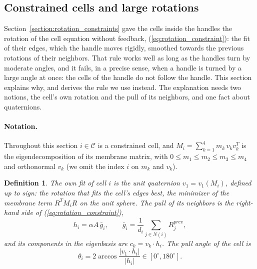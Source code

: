 \documentclass{birkjour}
\newtheorem{defn}[thm]{Definition}
\theoremstyle{remark}
\numberwithin{equation}{section}
\begin{document}
\subsection{Constrained cells and large rotations}
\label{section:hard_case}

Section~\ref{section:rotation_constraints} gave the cells inside the handles the rotation of the cell equation without feedback, (\ref{eq:rotation_constraint}): the fit of their edges, which the handle moves rigidly, smoothed towards the previous rotations of their neighbors. That rule works well as long as the handles turn by moderate angles, and it fails, in a precise sense, when a handle is turned by a large angle at once: the cells of the handle do not follow the handle. This section explains why, and derives the rule we use instead. The explanation needs two notions, the cell's own rotation and the pull of its neighbors, and one fact about quaternions.

\paragraph{Notation.} Throughout this section $i \in \mathcal C$ is a constrained cell, and $M_i = \sum_{k=1}^4 m_k \, v_k v_k^T$ is the eigendecomposition of its membrane matrix, with $0 \leq m_1 \leq m_2 \leq m_3 \leq m_4$ and orthonormal $v_k$ (we omit the index $i$ on $m_k$ and $v_k$).
\begin{defn}
\label{defn:pull}
The \emph{own fit} of cell $i$ is the unit quaternion $v_1 = v_1(M_i)$, defined up to sign: the rotation that fits the cell's edges best, the minimizer of the membrane term $R^T M_i R$ on the unit sphere. The \emph{pull} of its neighbors is the right-hand side of (\ref{eq:rotation_constraint}),
\begin{equation*}
h_i = \alpha A \, \bar g_i, \qquad \bar g_i = \frac{1}{d_i} \sum_{j \in N(i)} R^{prev}_j ,
\end{equation*}
and its components in the eigenbasis are $c_k = v_k \cdot h_i$. The \emph{pull angle} of the cell is
\begin{equation}
\label{eq:pull_angle}
\theta_i = 2 \arccos \frac{|v_1 \cdot h_i|}{|h_i|} \in [0^\circ, 180^\circ] .
\end{equation}
\end{defn}
\end{document}
